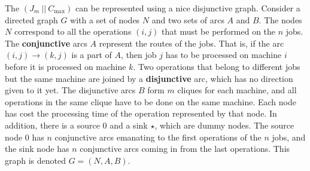 The $(J_m~||~C_{\max})$ can be represented using a nice disjunctive graph. 
Consider a directed graph $G$ with a set of nodes $N$ and two sets of 
arcs $A$ and $B$. The nodes $N$ correspond to all the operations $(i, j)$ 
that must be performed on the $n$ jobs. The {\bf conjunctive} arcs $A$
represent the routes of the jobs. That is, if the arc $(i, j) \to (k, j)$ 
is a part of $A$, then job $j$ has to be processed on machine $i$ before 
it is processed on machine $k$. Two operations that belong to different 
jobs but the same machine are joined by a {\bf disjunctive} arc, 
which has no direction given to it yet. The disjunctive arcs $B$ form 
$m$ cliques for each machine, and all operations in the same clique 
have to be done on the same machine. Each node has cost the processing 
time of the operation represented by that node. In addition, there is a 
source $0$ and a sink $\star$, which are dummy nodes. The source node $0$ 
has $n$ conjunctive arcs emanating to the first operations of the $n$ jobs, 
and the sink node has $n$ conjunctive arcs coming in from the last operations. 
This graph is denoted $G = (N, A, B)$. 
\begin{center}
\end{center}

